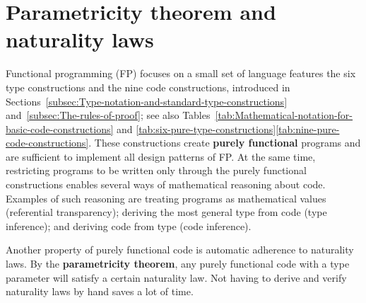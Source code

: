 \begin{comment}
your compiler does not have some critical bugs that allow it to oversee
that you have not followed the derivation rules of the logic that
is an extremely valuable feature of functional programming languages
that are based on the Curie habit correspondence you can prove their
safety at compile time or at least exclude a large number of possible
bugs and errors certainly these languages are quite large and they
include features that are not covered by the Carey Hart correspondence
type constructors that I have not considered in this tutorial and
those might may not be safe but at least the foundation of these languages
the foundation of the type system will be safe so that is the final
lesson from the great Howard correspondence this concludes the tutorial 
\end{comment}


\chapter{Parametricity theorem and naturality laws\label{app:Proofs-of-naturality-parametricity}}

Functional programming (FP) focuses on a small set of language features
\textemdash{} the six type constructions and the nine code constructions,
introduced in Sections~\ref{subsec:Type-notation-and-standard-type-constructions}
and~\ref{subsec:The-rules-of-proof}; see also Tables~\ref{tab:Mathematical-notation-for-basic-code-constructions}
and \ref{tab:six-pure-type-constructions}\textendash \ref{tab:nine-pure-code-constructions}.
These constructions create \textbf{purely functional} programs
and are sufficient to implement all design patterns of FP. At the
same time, restricting programs to be written only through the purely
functional constructions enables several ways of mathematical reasoning
about code. Examples of such reasoning are treating programs as mathematical
values (referential transparency); deriving the most general type
from code (type inference); and deriving code from type (code inference).

Another property of purely functional code is automatic adherence
to naturality laws. By the \textbf{parametricity theorem},
any purely functional code with a type parameter will satisfy a certain
naturality law. Not having to derive and verify naturality laws by
hand saves a lot of time.

